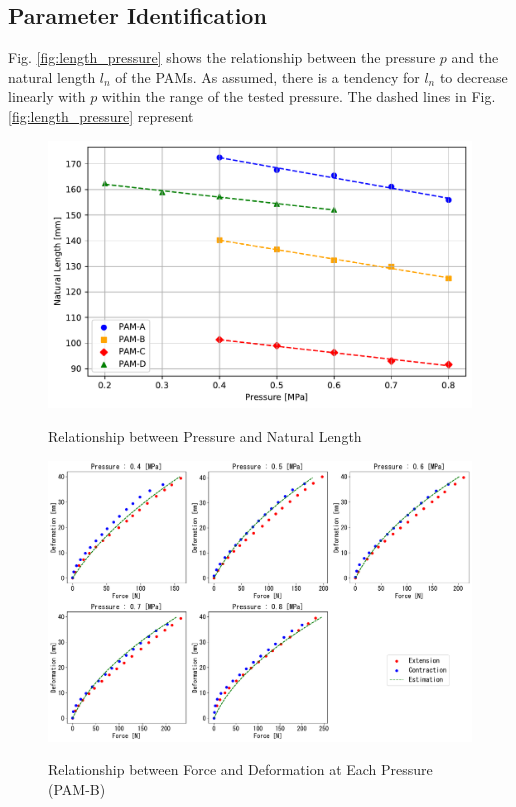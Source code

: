 \subsection{Parameter Identification}
Fig. \ref{fig:length_pressure} shows the relationship between the pressure $p$ and the natural length $l_n$ of the PAMs. As assumed, there is a tendency for $l_n$ to decrease linearly with $p$ within the range of the tested pressure. The dashed lines in Fig. \ref{fig:length_pressure} represent

\begin{figure}[t]
    \hfill
    \begin{minipage}{\columnwidth}
        \centering
        \includegraphics[width=\columnwidth]{fig/length_pressure.pdf} 
        \caption{Relationship between Pressure and Natural Length}
        \label{fig:length_pressure}
        \vspace{1em} 
        \includegraphics[width=\columnwidth]{fig/20231124_5_4s_2d_ieeesensors1.pdf}
        \caption{Relationship between Force and Deformation at Each Pressure (PAM-B)}
        \label{fig:pam_b_static1}
    \end{minipage}
    \hspace{0.05\textwidth} 
\end{figure}

